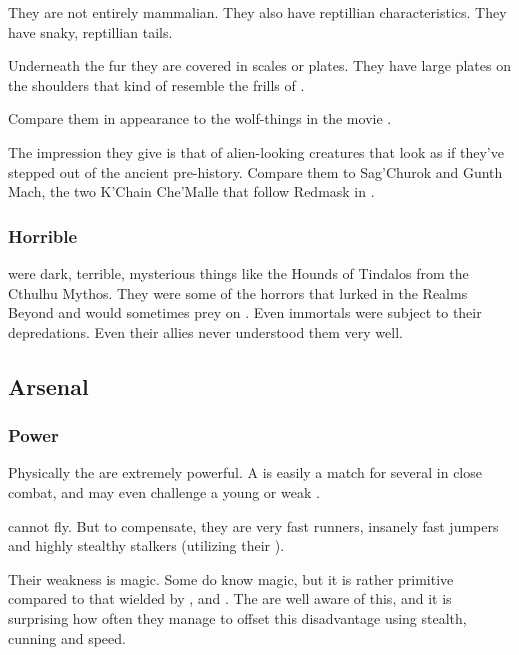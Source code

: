 They are not entirely mammalian. 
They also have reptillian characteristics. 
They have snaky, reptillian tails. 

Underneath the fur they are covered in \armoured scales or plates. 
They have large \armour plates on the shoulders that kind of resemble the frills of \mulgrons. 

Compare them in appearance to the wolf-things in the movie . 

The impression they give is that of alien-looking creatures that look as if they've stepped out of the ancient pre-history. 
Compare them to Sag'Churok and Gunth Mach, the two K'Chain Che'Malle that follow Redmask in \MalazanReapersGale.





\subsubsection{Horrible}
\Vorcanths were dark, terrible, mysterious things like the Hounds of Tindalos from the Cthulhu Mythos. 
They were some of the horrors that lurked in the Realms Beyond and would sometimes prey on \Miithians. 
Even immortals were subject to their depredations. 
Even their \resphan allies never understood them very well. 









\subsection{Arsenal}





\subsubsection{Power}
Physically the \vorcanths{} are extremely powerful. 
A \vorcanth{} is easily a match for several \resphain{} in close combat, and may even challenge a young or weak \dragon{}. 

\Vorcanths{} cannot fly. 
But to compensate, they are very fast runners, insanely fast jumpers and highly stealthy stalkers (utilizing their ). 

Their weakness is magic. 
Some \vorcanths{} do know magic, but it is rather primitive compared to that wielded by \dragons{}, \resphain{} and \quiljaaran{}. 
The \vorcanths{} are well aware of this, and it is surprising how often they manage to offset this disadvantage using stealth, cunning and speed. 






